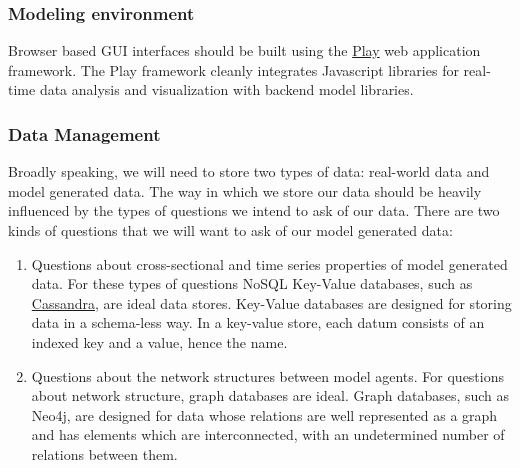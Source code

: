 \documentclass[11pt]{amsart}
\begin{document}
\subsubsection{Modeling environment}
Browser based GUI interfaces should be built using the \href{https://www.playframework.com/}{Play} web application framework. The Play framework cleanly integrates Javascript libraries for real-time data analysis and visualization with backend model libraries.

\subsubsection{Data Management}
Broadly speaking, we will need to store two types of data: real-world data and model generated data. The way in which we store our data should be heavily influenced by the types of questions we intend to ask of our data. 
There are two kinds of questions that we will want to ask of our model generated data:
\begin{enumerate}
    \item Questions about cross-sectional and time series properties of model generated data. For these types of questions NoSQL Key-Value databases, such as \href{http://cassandra.apache.org/}{Cassandra},  are ideal data stores. Key-Value databases are designed for storing data in a schema-less way. In a key-value store, each datum consists of an indexed key and a value, hence the name. 
    \item Questions about the network structures between model agents. For questions about network structure, graph databases are ideal.  Graph databases, such as Neo4j, are designed for data whose relations are well represented as a graph and has elements which are interconnected, with an undetermined number of relations between them.
\end{enumerate} 
\end{document}
